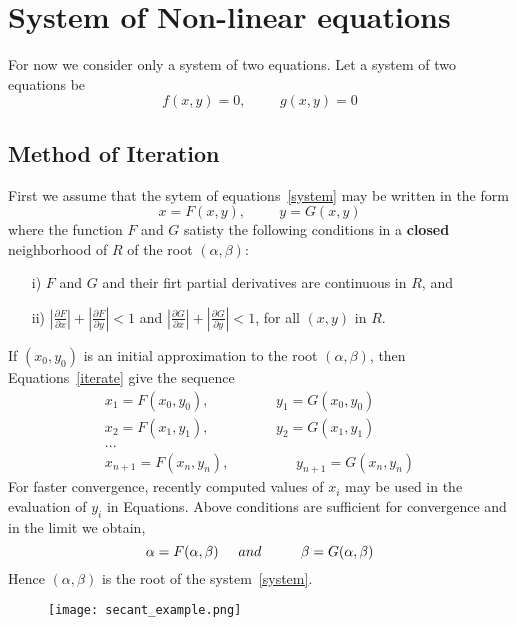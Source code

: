 \documentclass[aima203_lecturenotes_ku.tex]{subfiles}
\begin{document}
\section{System of Non-linear equations}
For now we consider only a system of two equations. Let a system of two equations be
\begin{equation}
  \label{system}
  f(x,y)=0, \hspace{1cm} g(x,y)=0
\end{equation}
\subsection{Method of Iteration}
First we assume that the sytem of equations~\ref{system} may be written in the form
\begin{equation}
  \label{iterate}
  x=F(x,y), \hspace{1cm} y=G(x,y)
\end{equation}
where the function $F$ and $G$ satisty the following conditions in a \textbf{closed} neighborhood of $R$ of the root $(\alpha, \beta)$:
\begin{enumerate}
\item[i)] $F$ and $G$ and their firt partial derivatives are continuous in $R$, and
  \item[ii)] $\displaystyle \left | \frac{\partial F}{\partial x} \right | + \left | \frac{\partial F}{\partial y} \right | < 1$ and $\displaystyle \left | \frac{\partial G}{\partial x} \right | + \left | \frac{\partial G}{\partial y} \right | < 1$, for all $(x,y)$ in $R$.
\end{enumerate}
If $(x_0,y_0)$ is an initial approximation to the root $(\alpha, \beta)$, then Equations~\ref{iterate} give the sequence
\begin{equation}
\begin{gathered}
  x_1 = F(x_0,y_0), \hspace{2cm} y_1 = G(x_0,y_0) \\
  x_2 = F(x_1,y_1), \hspace{2cm} y_2 = G(x_1,y_1) \\
  ... \\
  x_{n+1} = F(x_n,y_n), \hspace{2cm} y_{n+1} = G(x_n,y_n)
\end{gathered}
\end{equation}
For faster convergence, recently computed values of $x_i$ may be used in the evaluation of $y_i$ in Equations. Above conditions are sufficient for convergence and in the limit we obtain,
\begin{equation}
  \alpha = F(\alpha, \beta) \hspace{5mm} and \hspace{1cm} \beta=G(\alpha, \beta)
\end{equation}
Hence $(\alpha, \beta)$ is the root of the system~\ref{system}.
\begin{figure}[h]
  \centering
\texttt{[image: secant\_example.png]}
\end{figure}
\end{document}
